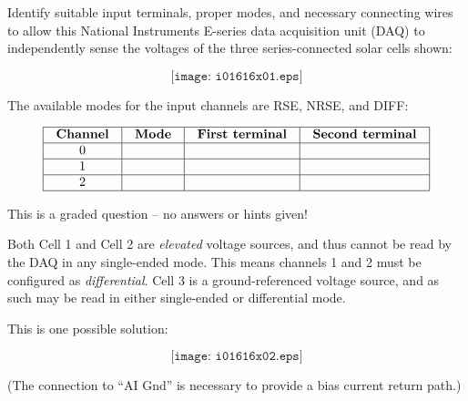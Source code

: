 

Identify suitable input terminals, proper modes, and necessary connecting wires to allow this National Instruments E-series data acquisition unit (DAQ) to independently sense the voltages of the three series-connected solar cells shown:

$$\texttt{[image: i01616x01.eps]}$$

The available modes for the input channels are RSE, NRSE, and DIFF:


$$\vbox{\offinterlineskip
\halign{\strut
\vrule \quad\hfil # \ \hfil & 
\vrule \quad\hfil # \ \hfil & 
\vrule \quad\hfil # \ \hfil & 
\vrule \quad\hfil # \ \hfil \vrule \cr
\noalign{\hrule}
%
{\bf Channel} & {\bf Mode} & {\bf First terminal} & {\bf Second terminal} \cr
%
\noalign{\hrule}
%
0 &  &  &  \cr
%
\noalign{\hrule}
%
1 &  &  &  \cr
%
\noalign{\hrule}
%
2 &  &  &  \cr
%
\noalign{\hrule}
} %
}$$ %

\vfil 

\eject






This is a graded question -- no answers or hints given!







Both Cell 1 and Cell 2 are {\it elevated} voltage sources, and thus cannot be read by the DAQ in any single-ended mode.  This means channels 1 and 2 must be configured as {\it differential}.  Cell 3 is a ground-referenced voltage source, and as such may be read in either single-ended or differential mode.

\vskip 10pt

This is one possible solution:

$$\texttt{[image: i01616x02.eps]}$$

(The connection to ``AI Gnd'' is necessary to provide a bias current return path.)

